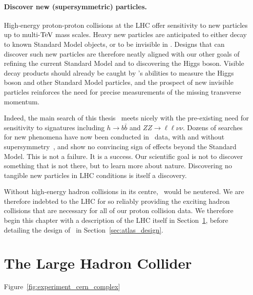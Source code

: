 \paragraph{Discover new (supersymmetric) particles.}
High-energy proton-proton collisions at the LHC offer sensitivity
to new particles up to multi-$\eV[T]$ mass scales.
Heavy new particles are anticipated to either decay to known Standard Model
objects, or to be invisible in \atlas.
Designs that can discover such new particles are therefore neatly aligned with
our other goals of refining the current Standard Model
and to discovering the Higgs boson.
Visible decay products should already be caught by \atlas's abilities
to measure the Higgs boson and other Standard Model particles,
and the prospect of new invisible particles reinforces the need for precise
measurements of the missing transverse momentum.

Indeed, the main search of this thesis~\cite{atlas2022searches}
meets nicely with the pre-existing need for sensitivity to signatures
including
$h \to b\bar b$
and
$ZZ \to \ell\ell\nu\nu$.
Dozens of searches for new phenomena have now been conducted in \atlas\ data,
with and without supersymmetry~\cite{
ATL-PHYS-PUB-2022-013,
ATL-PHYS-PUB-2022-007,
ATL-PHYS-PUB-2022-012,
ATL-PHYS-PUB-2022-036,
ATL-PHYS-PUB-2022-034
},
and show no convincing sign of effects beyond the Standard Model.
This is not a failure. It is a success.
Our scientific goal is not to discover something that is not there,
but to learn more about nature.
Discovering no tangible new particles in LHC conditions is itself a discovery.

Without high-energy hadron collisions in its centre, \atlas\ would be neutered.
We are therefore indebted to the LHC for so reliably providing the exciting
hadron collisions that are necessary for all of our proton collision data.
We therefore begin this chapter with a description of the LHC itself in
Section~\ref{sec:atlas_lhc}, before detailing the design of \atlas\ in
Section~\ref{sec:atlas_design}.

\section{The Large Hadron Collider}
\label{sec:atlas_lhc}

Figure~\ref{fig:experiment_cern_complex}

